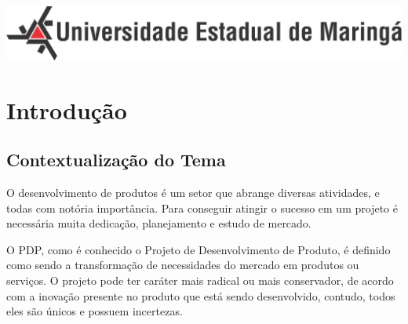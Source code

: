 \documentclass[
	12pt,				%
	openright,			%
	oneside,			%
	a4paper,			%
	english,			%
	french,				%
	spanish,			%
	brazil				%
	]{abntex2}
\begin{document}
\begin{minipage}[c][0cm][c]{0cm} %

\centering

\includegraphics[scale=0.45]{../../Pictures/uem-modelo-04.png}  
\end{minipage}


\frenchspacing 


\imprimircapa



 
 


\tableofcontents*
\cleardoublepage

\textual

\chapter{Introdução}

\section{Contextualização do Tema}

O desenvolvimento de produtos é um setor que abrange diversas atividades, e todas
com notória importância. Para conseguir atingir o sucesso em um projeto é necessária
muita dedicação, planejamento e estudo de mercado.

O PDP, como é conhecido o Projeto de Desenvolvimento de Produto, é definido como sendo a transformação de necessidades do mercado em produtos ou serviços. O projeto pode ter caráter mais radical ou mais conservador, de acordo com a inovação presente no produto que está sendo desenvolvido, contudo, todos eles são únicos e possuem incertezas. \cite{rozenfeld}
\end{document}

